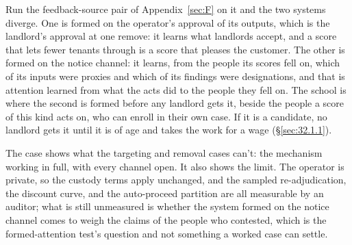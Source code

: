Run the feedback-source pair of Appendix~\ref{sec:F} on it and the two systems diverge. One is formed on the operator's approval of its outputs, which is the landlord's approval at one remove: it learns what landlords accept, and a score that lets fewer tenants through is a score that pleases the customer. The other is formed on the notice channel: it learns, from the people its scores fell on, which of its inputs were proxies and which of its findings were designations, and that is attention learned from what the acts did to the people they fell on. The school is where the second is formed before any landlord gets it, beside the people a score of this kind acts on, who can enroll in their own case. If it is a candidate, no landlord gets it until it is of age and takes the work for a wage (\S\ref{sec:32.1.1}).

The case shows what the targeting and removal cases can't: the mechanism working in full, with every channel open. It also shows the limit. The operator is private, so the custody terms apply unchanged, and the sampled re-adjudication, the discount curve, and the auto-proceed partition are all measurable by an auditor; what is still unmeasured is whether the system formed on the notice channel comes to weigh the claims of the people who contested, which is the formed-attention test's question and not something a worked case can settle.
